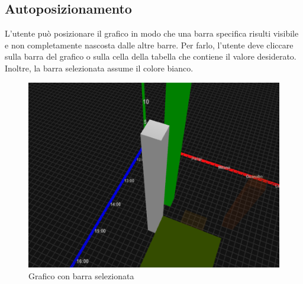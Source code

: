 \subsection{Autoposizionamento}
L'utente può posizionare il grafico in modo che una barra specifica risulti
visibile e non completamente nascosta dalle altre barre. 
Per farlo, l'utente deve cliccare sulla barra del grafico o sulla
cella della tabella che contiene il valore desiderato. Inoltre, la barra
selezionata assume il colore bianco.
\begin{figure}[ht!]
    \centering
    \includegraphics[scale=0.6]{template/images/selected.png}
    \caption{Grafico con barra selezionata}
\end{figure}